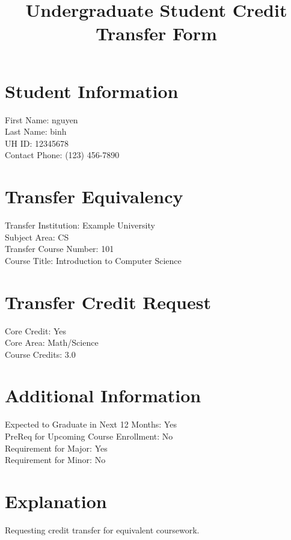 \documentclass{article}
\begin{document}
    
    \title{Undergraduate Student Credit Transfer Form}
    \maketitle
    
    \section*{Student Information}
    First Name: nguyen\\
    Last Name:  binh\\
    UH ID: 12345678\\
    Contact Phone: (123) 456-7890\\
    
    \section*{Transfer Equivalency}
    Transfer Institution: Example University\\
    Subject Area: CS\\
    Transfer Course Number: 101\\
    Course Title: Introduction to Computer Science\\
    
    \section*{Transfer Credit Request}
    Core Credit: Yes\\
    Core Area: Math/Science\\
    Course Credits: 3.0\\
    
    \section*{Additional Information}
    Expected to Graduate in Next 12 Months: Yes\\
    PreReq for Upcoming Course Enrollment: No\\
    Requirement for Major: Yes\\
    Requirement for Minor: No\\
    
    \section*{Explanation}
    Requesting credit transfer for equivalent coursework.\\
    
    
\end{document}
